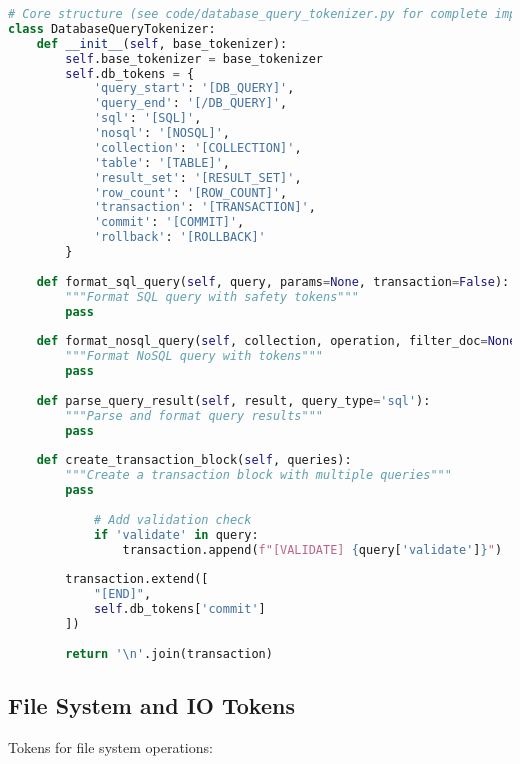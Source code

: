 \begin{lstlisting}[language=Python, caption=Database query tokens]
# Core structure (see code/database_query_tokenizer.py for complete implementation)
class DatabaseQueryTokenizer:
    def __init__(self, base_tokenizer):
        self.base_tokenizer = base_tokenizer
        self.db_tokens = {
            'query_start': '[DB_QUERY]',
            'query_end': '[/DB_QUERY]',
            'sql': '[SQL]',
            'nosql': '[NOSQL]',
            'collection': '[COLLECTION]',
            'table': '[TABLE]',
            'result_set': '[RESULT_SET]',
            'row_count': '[ROW_COUNT]',
            'transaction': '[TRANSACTION]',
            'commit': '[COMMIT]',
            'rollback': '[ROLLBACK]'
        }
    
    def format_sql_query(self, query, params=None, transaction=False):
        """Format SQL query with safety tokens"""
        pass
    
    def format_nosql_query(self, collection, operation, filter_doc=None, update_doc=None):
        """Format NoSQL query with tokens"""
        pass
    
    def parse_query_result(self, result, query_type='sql'):
        """Parse and format query results"""
        pass
    
    def create_transaction_block(self, queries):
        """Create a transaction block with multiple queries"""
        pass
            
            # Add validation check
            if 'validate' in query:
                transaction.append(f"[VALIDATE] {query['validate']}")
        
        transaction.extend([
            "[END]",
            self.db_tokens['commit']
        ])
        
        return '\n'.join(transaction)
\end{lstlisting}

\subsection{File System and IO Tokens}

Tokens for file system operations:


